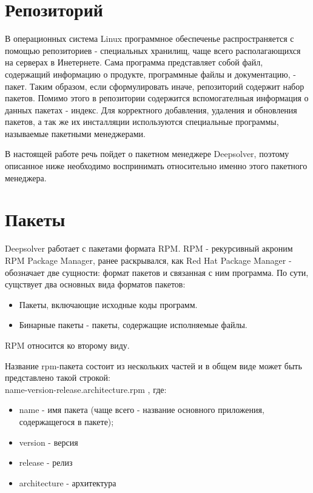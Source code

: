 ﻿\section{Репозиторий}
В операционных система Linux программное обеспеченье распространяется
с помощью репозиториев - специальных хранилищ, чаще всего располагающихся
на серверах в Инетернете. Сама программа представляет собой файл, содержащий
информацию о продукте, программные файлы и документацию, - пакет. Таким образом,
если сформулировать иначе, репозиторий содержит набор пакетов. Помимо этого
в репозитории содержится вспомогателньая информация о данных пакетах - индекс.
Для корректного добавления, удаления и обновления пакетов, а так же их инсталляции
используются специальные программы, называемые пакетными менеджерами. 

В настоящей работе речь пойдет о пакетном менеджере Deepsolver, поэтому описанное
ниже необходимо воспринимать относительно именно этого пакетного менеджера.

\section{ Пакеты }
Deepsolver работает с пакетами формата RPM. RPM  - рекурсивный акроним RPM Package Manager,
ранее раскрывался, как Red Hat Package Manager - обозначает две сущности: формат пакетов и 
связанная с ним программа.
По сути, сущствует два основных вида форматов пакетов: 
\begin{itemize}
\item{Пакеты, включающие исходные коды программ.}
\item{Бинарные пакеты - пакеты, содержащие исполняемые файлы.}
\end{itemize}
RPM относится ко второму виду.

Название rpm-пакета состоит из нескольких частей и в общем виде может быть представлено
такой строкой: \\
name-version-release.architecture.rpm , где:\\
\begin{itemize}
\item{name - имя пакета (чаще всего - название основного приложения, содержащегося в пакете);}
\item{version - версия}
\item{release - релиз}
\item{architecture - архитектура}
\end{itemize}

